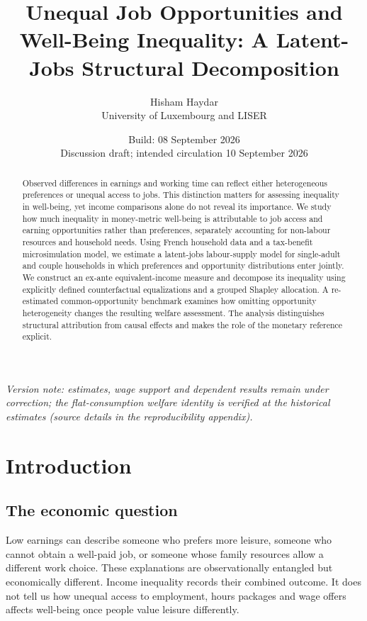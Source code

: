 \documentclass[11pt,a4paper]{article}
\title{Unequal Job Opportunities and Well-Being Inequality: A Latent-Jobs Structural Decomposition}
\author{Hisham Haydar\\University of Luxembourg and LISER}
\date{Build: 08 September 2026\\Discussion draft; intended circulation 10 September 2026}
\begin{document}
\maketitle
\begin{abstract}
Observed differences in earnings and working time can reflect either heterogeneous preferences or unequal access to jobs. This distinction matters for assessing inequality in well-being, yet income comparisons alone do not reveal its importance. We study how much inequality in money-metric well-being is attributable to job access and earning opportunities rather than preferences, separately accounting for non-labour resources and household needs. Using French household data and a tax-benefit microsimulation model, we estimate a latent-jobs labour-supply model for single-adult and couple households in which preferences and opportunity distributions enter jointly. We construct an ex-ante equivalent-income measure and decompose its inequality using explicitly defined counterfactual equalizations and a grouped Shapley allocation. A re-estimated common-opportunity benchmark examines how omitting opportunity heterogeneity changes the resulting welfare assessment. The analysis distinguishes structural attribution from causal effects and makes the role of the monetary reference explicit.
\end{abstract}

\emph{Version note: estimates, wage support and dependent results remain under correction; the flat-consumption welfare identity is verified at the historical estimates (source details in the reproducibility appendix).}

\section{Introduction}\label{introduction}

\subsection{The economic question}\label{the-economic-question}

Low earnings can describe someone who prefers more leisure, someone who cannot obtain a well-paid job, or someone whose family resources allow a different work choice. These explanations are observationally entangled but economically different. Income inequality records their combined outcome. It does not tell us how unequal access to employment, hours packages and wage offers affects well-being once people value leisure differently.
\end{document}
